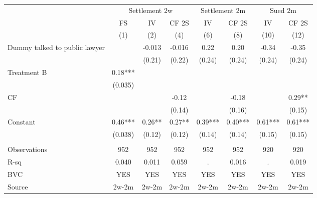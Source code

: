 \begin{tabular}{lccccccc}
\cmidrule{2-8}\multicolumn{1}{r|}{} & \multicolumn{3}{c|}{Settlement 2w} & \multicolumn{2}{c|}{Settlement 2m} & \multicolumn{2}{c|}{Sued 2m} \\
      & FS    & IV    & CF 2S & IV    & CF 2S & IV    & CF 2S \\
\midrule
\midrule
      & (1)   & (2)   & (4)   & (6)   & (8)   & (10)  & (12) \\
\midrule
\midrule
Dummy talked to public lawyer &       & -0.013 & -0.016 & 0.22  & 0.20  & -0.34 & -0.35 \\
      &       & (0.21) & (0.22) & (0.24) & (0.24) & (0.24) & (0.24) \\
Treatment B & 0.18*** &       &       &       &       &       &  \\
      & (0.035) &       &       &       &       &       &  \\
CF    &       &       & -0.12 &       & -0.18 &       & 0.29** \\
      &       &       & (0.14) &       & (0.16) &       & (0.15) \\
Constant  & 0.46*** & 0.26** & 0.27** & 0.39*** & 0.40*** & 0.61*** & 0.61*** \\
      & (0.038) & (0.12) & (0.12) & (0.14) & (0.14) & (0.15) & (0.15) \\
      &       &       &       &       &       &       &  \\
\midrule
Observations & 952   & 952   & 952   & 952   & 952   & 920   & 920 \\
R-sq  & 0.040 & 0.011 & 0.059 & .     & 0.016 & .     & 0.019 \\
BVC   & YES   & YES   & YES   & YES   & YES   & YES   & YES \\
Source & 2w-2m & 2w-2m & 2w-2m & 2w-2m & 2w-2m & 2w-2m & 2w-2m \\
\bottomrule
\bottomrule
\end{tabular}%
